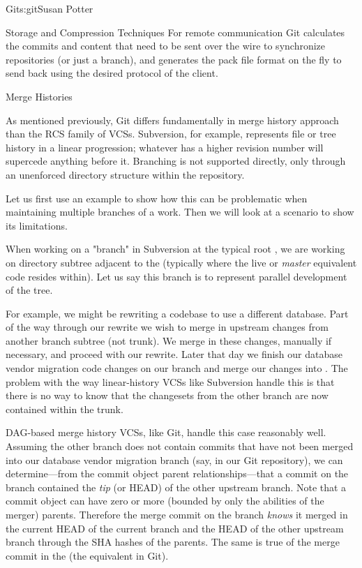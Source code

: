 \begin{aosachapter}{Git}{s:git}{Susan Potter}
\begin{aosasect1}{Storage and Compression Techniques}
For remote communication Git calculates the commits and content that need
to be sent over the wire to synchronize repositories (or just a branch), and
generates the pack file format on the fly to send back using the desired
protocol of the client.

\end{aosasect1}

\begin{aosasect1}{Merge Histories}

As mentioned previously, Git differs fundamentally in merge history approach
than the RCS family of VCSs. Subversion, for example, represents
file or tree history in a linear progression; whatever has a higher revision
number will supercede anything before it. Branching is not supported directly,
only through an unenforced directory structure within the repository.


Let us first use an example to show how this can be problematic when
maintaining multiple branches of a work. Then we will look at a scenario to
show its limitations.

When working on a "branch" in Subversion at the typical root
, we are working on directory subtree adjacent to
the  (typically where the live or \emph{master} equivalent code
resides within). Let us say this branch is to represent parallel development
of the  tree.

For example,
we might be rewriting a codebase to use a different database. Part of the
way through our rewrite we wish to merge in upstream changes from another
branch subtree (not trunk). We merge in these changes, manually if necessary,
and proceed with our rewrite. Later that day we finish our database vendor
migration code changes on our  branch and merge
our changes into . The problem with the way linear-history VCSs
like Subversion handle this is that there is no way to know that the
changesets from the other branch are now contained within the trunk.

DAG-based merge history VCSs, like Git, handle this case reasonably well.
Assuming the other branch does not contain commits that have not been merged
into our database vendor migration branch (say,  in our
Git repository), we can determine---from the commit object parent
relationships---that a commit on the  branch contained
the \emph{tip} (or HEAD) of the other upstream branch. Note that a commit
object can have zero or more (bounded by only the abilities of the merger)
parents. Therefore the merge commit on the  branch
\emph{knows} it merged in the current HEAD of the current branch and the
HEAD of the other upstream branch through the SHA hashes of the parents.
The same is true of the merge commit in the  (the 
equivalent in Git).


\end{aosasect1}
\end{aosachapter}
